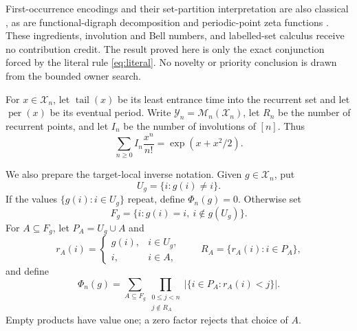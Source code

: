 \documentclass[a4paper,10pt]{amsart}
\theoremstyle{remark}
\newcommand{\M}{\mathcal M}
\newcommand{\X}{\mathcal X}
\newcommand{\Y}{\mathcal Y}
\newcommand{\tail}{\operatorname{tail}}
\newcommand{\per}{\operatorname{per}}
\begin{document}
First-occurrence encodings and their set-partition interpretation are also
classical \cite{BeanEtAl2026}, as are functional-digraph decomposition
\cite{FlajoletOdlyzko1989} and periodic-point zeta functions
\cite{ArtinMazur1965}.  These ingredients, involution and Bell numbers,
and labelled-set calculus receive no contribution credit.  The result
proved here is only the exact conjunction forced by the literal rule
\eqref{eq:literal}.  No novelty or priority conclusion is drawn from the
bounded owner search.

For $x\in\X_n$, let $\tail(x)$ be its least entrance time into the recurrent
set and let $\per(x)$ be its eventual period.  Write
$\Y_n=\M_n(\X_n)$, let $R_n$ be the number of recurrent points, and let
$I_n$ be the number of involutions of $[n]$.  Thus
\begin{equation}\label{eq:involution-egf}
 \sum_{n\geq0}I_n\frac{x^n}{n!}=\exp(x+x^2/2).
\end{equation}

We also prepare the target-local inverse notation.  Given $g\in\X_n$, put
\[
 U_g=\{i:g(i)\ne i\}.
\]
If the values $\{g(i):i\in U_g\}$ repeat, define $\Phi_n(g)=0$.  Otherwise
set
\[
 F_g=\{i:g(i)=i,\ i\notin g(U_g)\}.
\]
For $A\subseteq F_g$, let $P_A=U_g\cup A$ and
\[
 r_A(i)=\begin{cases}g(i),&i\in U_g,\\i,&i\in A,\end{cases}
 \qquad R_A=\{r_A(i):i\in P_A\},
\]
and define
\begin{equation}\label{eq:phi}
 \Phi_n(g)=\sum_{A\subseteq F_g}
 \prod_{\substack{0\leq j<n\\j\notin R_A}}
 \bigl|\{i\in P_A:r_A(i)<j\}\bigr|.
\end{equation}
Empty products have value one; a zero factor rejects that choice of $A$.
\end{document}
